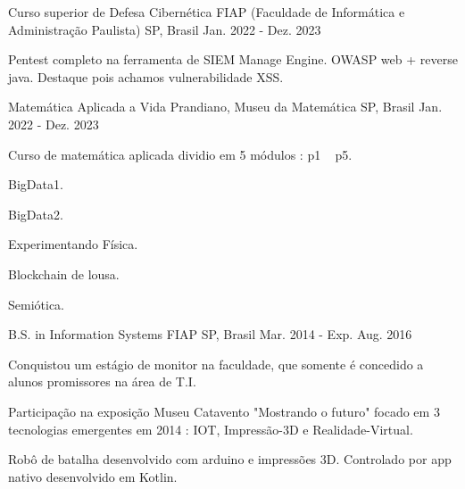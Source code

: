 

\begin{cventries}

  \cventry
    {Curso superior de Defesa Cibernética} %
    {FIAP (Faculdade de Informática e Administração Paulista)} %
    {SP, Brasil} %
    {Jan. 2022 - Dez. 2023} %
    {
      \begin{cvitems} %
        \item {Pentest completo na ferramenta de SIEM Manage Engine. OWASP web + reverse java. Destaque pois achamos vulnerabilidade XSS.}
      \end{cvitems}
    }
	\cventry
	{Matemática Aplicada a Vida} %
	{Prandiano, Museu da Matemática} %
	{SP, Brasil} %
	{Jan. 2022 - Dez. 2023} %
	{
		\begin{cvitems} %
			\item {Curso de matemática aplicada dividio em 5 módulos : p1 ~ p5. }
			\item {BigData1.}
			\item {BigData2.}
			\item {Experimentando Física.}
			\item {Blockchain de lousa.}
			\item {Semiótica.}
		\end{cvitems}
	}
  \cventry
	{B.S. in Information Systems} %
	{FIAP} %
	{SP, Brasil} %
	{Mar. 2014 - Exp. Aug. 2016} %
	{
		\begin{cvitems} %
			\item {Conquistou um estágio de monitor na faculdade, que somente é concedido a alunos promissores na área de T.I. }
			\item {Participação na exposição Museu Catavento "Mostrando o futuro" focado em 3 tecnologias emergentes em 2014 : IOT, Impressão-3D e Realidade-Virtual.}
			\item Robô de batalha desenvolvido com arduino e impressões 3D. Controlado por app nativo desenvolvido em Kotlin.
		\end{cvitems}
	}

\end{cventries}
